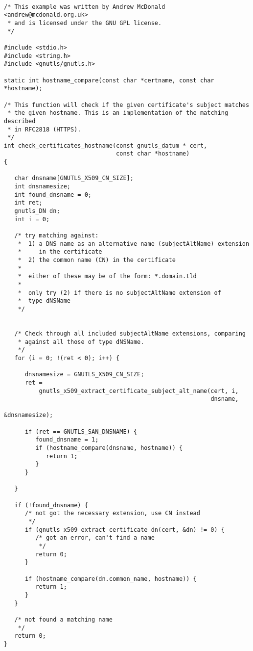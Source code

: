 \label{ex:rfc2818}
\begin{verbatim}

/* This example was written by Andrew McDonald <andrew@mcdonald.org.uk>
 * and is licensed under the GNU GPL license.
 */

#include <stdio.h>
#include <string.h>
#include <gnutls/gnutls.h>

static int hostname_compare(const char *certname, const char *hostname);

/* This function will check if the given certificate's subject matches
 * the given hostname. This is an implementation of the matching described
 * in RFC2818 (HTTPS).
 */
int check_certificates_hostname(const gnutls_datum * cert,
                                const char *hostname)
{

   char dnsname[GNUTLS_X509_CN_SIZE];
   int dnsnamesize;
   int found_dnsname = 0;
   int ret;
   gnutls_DN dn;
   int i = 0;

   /* try matching against:
    *  1) a DNS name as an alternative name (subjectAltName) extension
    *     in the certificate
    *  2) the common name (CN) in the certificate
    *
    *  either of these may be of the form: *.domain.tld
    *
    *  only try (2) if there is no subjectAltName extension of
    *  type dNSName
    */


   /* Check through all included subjectAltName extensions, comparing
    * against all those of type dNSName.
    */
   for (i = 0; !(ret < 0); i++) {

      dnsnamesize = GNUTLS_X509_CN_SIZE;
      ret =
          gnutls_x509_extract_certificate_subject_alt_name(cert, i,
                                                           dnsname,
                                                           &dnsnamesize);

      if (ret == GNUTLS_SAN_DNSNAME) {
         found_dnsname = 1;
         if (hostname_compare(dnsname, hostname)) {
            return 1;
         }
      }

   }

   if (!found_dnsname) {
      /* not got the necessary extension, use CN instead 
       */
      if (gnutls_x509_extract_certificate_dn(cert, &dn) != 0) {
         /* got an error, can't find a name 
          */
         return 0;
      }

      if (hostname_compare(dn.common_name, hostname)) {
         return 1;
      }
   }

   /* not found a matching name
    */
   return 0;
}


\end{verbatim}
